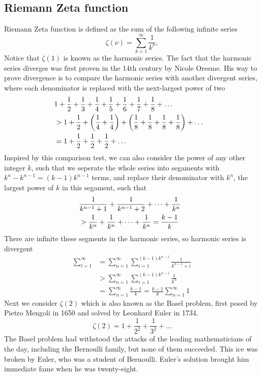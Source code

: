 \documentclass[10pt]{article}
\begin{document}
	\subsection{Riemann Zeta function}

	Riemann Zeta function is defined as the sum of the following infinite series
	\begin{equation}
		\zeta(\nu) = \sum_{k=1}^{\infty} \frac{1}{k^{\nu}},
	\end{equation}
	Notice that $\zeta(1)$ is known as the harmonic series. The fact that the harmonic series diverges was first proven in the 14th century by Nicole Oresme. His way to prove divergence is to compare the harmonic series with another divergent series, where each denominator is replaced with the next-largest power of two
	\begin{align*}
		\lefteqn{1 + \frac{1}{2} + \frac{1}{3} + \frac{1}{4} + \frac{1}{5} + \frac{1}{6} + \frac{1}{7} + \frac{1}{8} + \dots} \\
		&> 1 + \frac{1}{2} + \left(\frac{1}{4} + \frac{1}{4}\right) + \left(\frac{1}{8} + \frac{1}{8} + \frac{1}{8} + \frac{1}{8}\right) + \dots \\
		&= 1 + \frac{1}{2} + \frac{1}{2} + \frac{1}{2} + \dots
	\end{align*}
	Inspired by this comparison test, we can also consider the power of any other integer $k$, such that we seperate the whole series into segaments with $k^{n} - k^{n-1} = (k-1)k^{n-1}$ terms, and replace their denominator with $k^{n}$, the largest power of $k$ in this segament, such that
	\begin{align*}
		\lefteqn{\frac{1}{k^{n-1} +1} + \frac{1}{k^{n-1} + 2} + \dots + \frac{1}{k^n}}\\
		&> \frac{1}{k^n} + \frac{1}{k^n} + \dots + \frac{1}{k^n} = \frac{k-1}{k}
	\end{align*}
	There are infinite these segments in the harmonic series, so harmonic series is divergent
	\begin{align*}
		\sum_{l=1}^{\infty} &= \sum_{n=1}^{\infty} \sum_{i=1}^{(k-1)k^{n-1}} \frac{1}{k^{n-1} + i}\\
		&> \sum_{n=1}^{\infty} \sum_{i=1}^{(k-1)k^{n-1}} \frac{1}{k^n} \\
		&= \sum_{n=1}^{\infty} \frac{k-1}{k} = \frac{k-1}{k} \sum_{n=1}^{\infty} 1
	\end{align*}
	Next we consider $\zeta(2)$ which is also known as the Basel problem, first posed by Pietro Mengoli in 1650 and solved by Leonhard Euler in 1734.
	\begin{equation}
		\zeta(2) = 1 + \frac{1}{2^2} + \frac{1}{3^2} + \dots
	\end{equation}
	The Basel problem had withstood the attacks of the leading mathematicians of the day, including the Bernoulli family, but none of them succeeded. This ice was broken by Euler, who was a student of Bernoulli. Euler's solution brought him immediate fame when he was twenty-eight.
\end{document}
